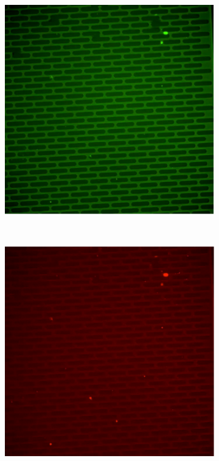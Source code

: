 \documentclass[pdftex,12pt,a4paper]{report}
\begin{document}
\begin{figure}[H]

\centering

\begin{subfigure}{0.5\textwidth}
  \centering
  \includegraphics[width=\textwidth]{images/caspase_onset_sample}
  \caption{}
  \label{fig:caspase_onset_sample}
\end{subfigure}%
~
\begin{subfigure}{0.5\textwidth}
  \centering
  \includegraphics[width=\textwidth]{images/pi_onset_sample}
  \caption{}
  \label{fig:pi_onset_sample}
\end{subfigure}%


\end{figure}
\end{document}
